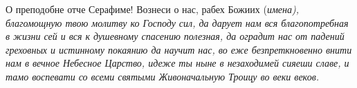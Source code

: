 \bigskip\bigskip\mychapterending

 


О преподобне отче Серафиме! Вознеси о нас, рабех Божиих (\itshape имена\normalfont{}), благомощную твою молитву ко Господу сил, да дарует нам вся благопотребная в жизни сей и вся к душевному спасению полезная, да оградит нас от падений греховных и истинному покаянию да научит нас, во еже безпреткновенно внити нам в вечное Небесное Царство, идеже ты ныне в незаходимей сияеши славе, и тамо воспевати со всеми святыми Живоначальную Троицу во веки веков. 


\bigskip\bigskip\mychapterending
